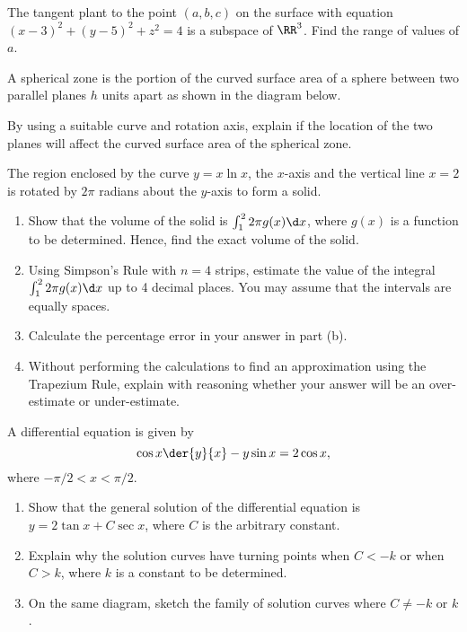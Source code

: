 \begin{problem}
    The tangent plant to the point $(a, b, c)$ on the surface with equation $(x-3)^2 + (y-5)^2 + z^2 = 4$ is a subspace of $\RR^3$. Find the range of values of $a$.
\end{problem}

\begin{problem}
    A spherical zone is the portion of the curved surface area of a sphere between two parallel planes $h$ units apart as shown in the diagram below.

    \begin{figure}[H]
        \centering
    \end{figure}

    By using a suitable curve and rotation axis, explain if the location of the two planes will affect the curved surface area of the spherical zone.
\end{problem}

\begin{problem}
    The region enclosed by the curve $y = x \ln x$, the $x$-axis and the vertical line $x = 2$ is rotated by $2\pi$ radians about the $y$-axis to form a solid.

    \begin{enumerate}
        \item Show that the volume of the solid is $\int_1^2 2\pi g(x) \d x$, where $g(x)$ is a function to be determined. Hence, find the exact volume of the solid.
        \item Using Simpson's Rule with $n = 4$ strips, estimate the value of the integral $\int_1^2 2\pi g(x) \d x$ up to 4 decimal places. You may assume that the intervals are equally spaces.
        \item Calculate the percentage error in your answer in part (b).
        \item Without performing the calculations to find an approximation using the Trapezium Rule, explain with reasoning whether your answer will be an over-estimate or under-estimate.
    \end{enumerate}
\end{problem}

\begin{problem}
    A differential equation is given by \[\cos x \der{y}{x} - y \sin x = 2 \cos x,\] where $-\pi/2 < x < \pi/2$.

    \begin{enumerate}
        \item Show that the general solution of the differential equation is $y = 2 \tan x + C \sec x$, where $C$ is the arbitrary constant.
        \item Explain why the solution curves have turning points when $C < -k$ or when $C > k$, where $k$ is a constant to be determined.
        \item On the same diagram, sketch the family of solution curves where $C \neq -k$ or $k$.
    \end{enumerate}
\end{problem}

